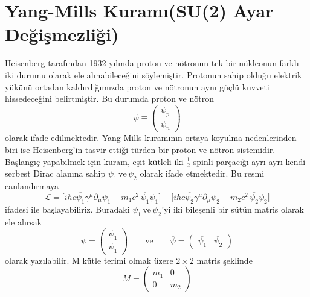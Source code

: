 \section{Yang-Mills Kuramı(SU(2) Ayar Değişmezliği)}
Heisenberg tarafından 1932 yılında proton ve nötronun tek bir nükleonun farklı iki durumu olarak ele alınabileceğini söylemiştir. Protonun sahip olduğu elektrik yükünü ortadan kaldırdığımızda proton ve nötronun aynı güçlü kuvveti hissedeceğini belirtmiştir. Bu durumda proton ve nötron 
\begin{equation} \label{ym1}
\psi \equiv \left(\begin{array}{c}
\psi_{p} \\ 
\psi_{n}
\end{array}\right)
\end{equation}
olarak ifade edilmektedir. Yang-Mills kuramının ortaya koyulma nedenlerinden biri ise Heisenberg'in tasvir ettiği türden bir proton ve nötron sistemidir. Başlangıç yapabilmek için kuram, eşit kütleli iki  $\frac{1}{2}$ spinli parçacığı ayrı ayrı kendi serbest Dirac alanına sahip $\psi_{1}\,\textrm{ve}\,\psi_{2}$ olarak ifade etmektedir. Bu resmi canlandırmaya
\begin{equation} \label{ym2}
\mathcal{L} = \big[i\hbar c\overline{\psi_{1}}\gamma^{\mu}\partial_{\mu} \psi_{1} -m_{1}c^{2}\,\overline{\psi_{1}}\psi_{1}\big] +  \big[i\hbar c\overline{\psi_{2}}\gamma^{\mu}\partial_{\mu} \psi_{2} -m_{2}c^{2}\,\overline{\psi_{2}}\psi_{2}\big]
\end{equation}
ifadesi ile başlayabiliriz. Buradaki $\psi_{1}\, \textrm{ve}\, \psi_{2}$'yi iki bileşenli bir sütün matris olarak ele alırsak
\begin{equation} \label{ym3}
\psi = \left(\begin{array}{c}
\psi_{1} \\ 
\psi_{1} 
\end{array} \right)
\qquad\textrm{ve}\qquad
\overline{\psi} = 
\left(\begin{array}{cc}
\overline{\psi_{1}} & \overline{\psi_{2}}
\end{array}\right) 
\end{equation}  
olarak yazılabilir. M kütle terimi olmak üzere $2 \times 2$ matris şeklinde
\begin{equation} \label{ym4}
M = \left(\begin{array}{cc}
m_{1} & 0 \\ 
0     & m_{2}
\end{array} \right)
\end{equation}
